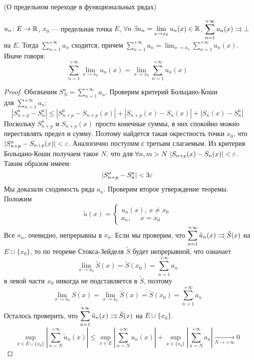 \begin{theorem}(О предельном переходе в функциональных рядах)

    $u_n \colon E \to \mathbb{R}$, $x_0$ --- предельная точка $E$, $\displaystyle
    \forall n~ \exists a_n = \lim_{x \to x_0}{u_n(x)} \in \mathbb{R}$, $\displaystyle
    \sum_{n = 1}^{+\infty}{u_n(x)} \rightrightarrows \bot$ на $E$. Тогда $\displaystyle
    \sum_{n = 1}^{+\infty}{a_n}$ сходится, причем $\displaystyle \sum_{n =
    1}^{+\infty}{a_n} = \lim_{x \to x_0}{\sum_{n = 1}^{+\infty}{u_n(x)}}$.
    Иначе говоря:
\[
    \sum_{n = 1}^{+\infty}{\lim_{x \to x_0}{u_n(x)}}
    = \lim_{x \to x_0}{\sum_{n = 1}^{+\infty}{u_n(x)}}
\]
\end{theorem}
\begin{proof}

    Обозначим $\displaystyle S^a_N = \sum_{n = 1}^{+\infty}{a_n}$. Проверим
    критерий Больцано-Коши \\ для $\displaystyle \sum_{n = 1}^{+\infty}{a_n}$:
\[
    |S^a_{n + p} - S^a_n| \leqslant |S^a_{n + p} - S_{n + p}(x)|
    + |S_{n + p}(x) - S_n(x)|
    + |S_n(x) - S^a_n|
\]
    Поскольку $S^a_{n + p}$ и $S_{n + p}(x)$ просто конечные суммы, в них
    спокойно можно переставлять предел и сумму. Поэтому найдется такая
    окрестность точки $x_0$, что \\ $|S^a_{n + p} - S_{n + p}(x)| < \varepsilon$.
    Аналогично поступим с третьим слагаемым. Из критерия Больцано-Коши получаем
    такое $N$, что для $\forall n, m > N~ |S_{n + p}(x) - S_n(x)| < \varepsilon$.
    Таким образом имеем:
\[
    |S^a_{n + p} - S^a_n| < 3\varepsilon
\]
    Мы доказали сходимость ряда $a_n$. Проверим второе утверждение теоремы.
    Положим
\[
    \tilde{u}(x) = \begin{cases}
                    u_n(x),~ x \neq x_0 \\
                    a_n,~~~~~~ x = x_0
                    \end{cases}
\]
    Все $u_n$, очевидно, непрерывны в $x_0$. Если мы проверим, что
    $\displaystyle \sum_{n = 1}^{+\infty}{\tilde{u}_n(x)} \rightrightarrows \tilde{S}(x)$
    на $E \cup \{x_0\}$, то по теореме Стокса-Зейделя $\tilde{S}$ будет
    непрерывной, что означает
\[
    \lim_{x \to x_0}{\tilde{S}(x)} = \tilde{S}(x_0) = \sum_{n =
    1}^{+\infty}{a_n}
\]
    в левой части $x_0$ никогда не подставляется в $\tilde{S}$, поэтому
\[
    \lim_{x \to x_0}{S(x)} = \lim_{x \to x_0}{\tilde{S}(x)} = \tilde{S}(x_0) =
    \sum_{n = 1}^{+\infty}{a_n}
\]
    Осталось проверить, что $\displaystyle \sum_{n =
    1}^{+\infty}{\tilde{u}_n(x)} \rightrightarrows \tilde{S}(x)$ на $E \cup \{x_0\}$.
\[
    \sup_{x \in E \cup \{x_0\}}{\left|\sum_{n =
    N}^{+\infty}{\tilde{u}_n(x)}\right|} \leqslant \sup_{x \in E}{\left|
    \sum_{n = N}^{+\infty}{u_n(x)} \right|} + \sup_{x \in \{x_0\}}{\left| 
    \sum_{n = N}^{+\infty}{a_n} \right|} \xrightarrow[N \to +\infty]{} 0
\]
\end{proof}

